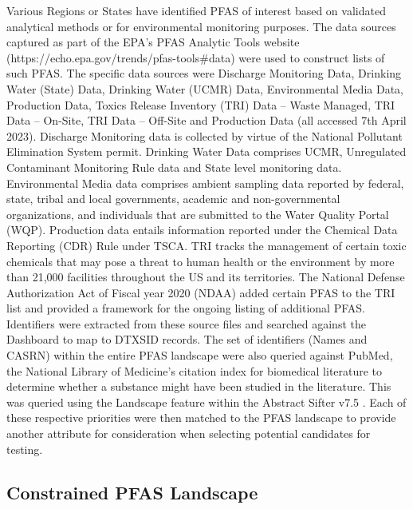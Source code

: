 \documentclass[
  super,
  preprint,
  3p]{elsarticle}
\begin{document}
Various Regions or States have identified PFAS of interest based on
validated analytical methods or for environmental monitoring purposes.
The data sources captured as part of the EPA's PFAS Analytic Tools
website (https://echo.epa.gov/trends/pfas-tools\#data) were used to
construct lists of such PFAS. The specific data sources were Discharge
Monitoring Data, Drinking Water (State) Data, Drinking Water (UCMR)
Data, Environmental Media Data, Production Data, Toxics Release
Inventory (TRI) Data -- Waste Managed, TRI Data -- On-Site, TRI Data --
Off-Site and Production Data (all accessed 7th April 2023). Discharge
Monitoring data is collected by virtue of the National Pollutant
Elimination System permit. Drinking Water Data comprises UCMR,
Unregulated Contaminant Monitoring Rule data and State level monitoring
data. Environmental Media data comprises ambient sampling data reported
by federal, state, tribal and local governments, academic and
non-governmental organizations, and individuals that are submitted to
the Water Quality Portal (WQP). Production data entails information
reported under the Chemical Data Reporting (CDR) Rule under TSCA. TRI
tracks the management of certain toxic chemicals that may pose a threat
to human health or the environment by more than 21,000 facilities
throughout the US and its territories. The National Defense
Authorization Act of Fiscal year 2020 (NDAA) added certain PFAS to the
TRI list and provided a framework for the ongoing listing of additional
PFAS.\\
Identifiers were extracted from these source files and searched against
the Dashboard to map to DTXSID records. The set of identifiers (Names
and CASRN) within the entire PFAS landscape were also queried against
PubMed, the National Library of Medicine's citation index for biomedical
literature to determine whether a substance might have been studied in
the literature. This was queried using the Landscape feature within the
Abstract Sifter v7.5 \citep{baker_abstract_2017}. Each of these
respective priorities were then matched to the PFAS landscape to provide
another attribute for consideration when selecting potential candidates
for testing.

\hypertarget{sec-constrained}{%
\subsection{Constrained PFAS Landscape}\label{sec-constrained}}
\end{document}
